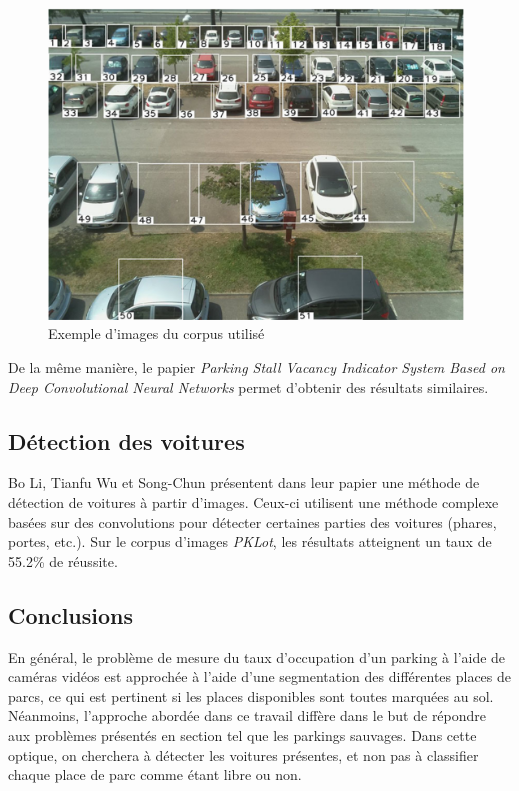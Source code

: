 \begin{figure}[ht]
    \includegraphics[width=110mm]{img/introduction/dlp_example.png}
    \centering
    \caption{Exemple d'images du corpus utilisé}
    \label{fig:dlp_example}
\end{figure} 

De la même manière, le papier \textit{Parking Stall Vacancy Indicator System Based on Deep Convolutional Neural Networks} permet d'obtenir des résultats similaires. \autocite{paper:psv}

\subsection{Détection des voitures}
Bo Li, Tianfu Wu et Song-Chun présentent dans leur papier une méthode de détection de voitures à partir d'images. Ceux-ci utilisent une méthode complexe basées sur des convolutions pour détecter certaines parties des voitures (phares, portes, etc.). Sur le corpus d'images \textit{PKLot}, les résultats atteignent un taux de 55.2\% de réussite. \autocite{paper:car_detect}

\subsection{Conclusions}

En général, le problème de mesure du taux d'occupation d'un parking à l'aide de caméras vidéos est approchée à l'aide d'une segmentation des différentes places de parcs, ce qui est pertinent si les places disponibles sont toutes marquées au sol. Néanmoins, l'approche abordée dans ce travail diffère dans le but de répondre aux problèmes présentés en section  tel que les parkings sauvages. Dans cette optique, on cherchera à détecter les voitures présentes, et non pas à classifier chaque place de parc comme étant libre ou non.